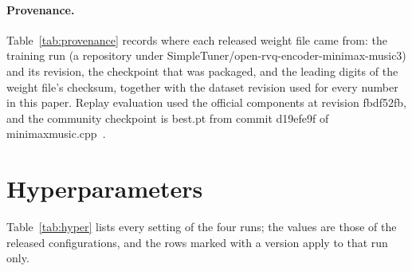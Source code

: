 

\paragraph{Provenance.} Table~\ref{tab:provenance} records where each released weight file came from: the training run (a repository under SimpleTuner/open-rvq-encoder-minimax-music3) and its revision, the checkpoint that was packaged, and the leading digits of the weight file's checksum, together with the dataset revision used for every number in this paper. Replay evaluation used the official components at revision fbdf52fb, and the community checkpoint is best.pt from commit d19efe9f of minimaxmusic.cpp~\cite{serveurperso2026encoder}.




\section{Hyperparameters}
\label{app:hyper}

Table~\ref{tab:hyper} lists every setting of the four runs; the values are those of the released configurations, and the rows marked with a version apply to that run only.

